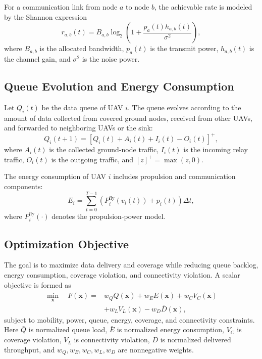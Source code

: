 \documentclass[lettersize,journal]{IEEEtran}
\begin{document}
For a communication link from node $a$ to node $b$, the achievable rate is modeled by the Shannon expression
\begin{equation}
r_{a,b}(t)=B_{a,b}\log_2\left(1+\frac{p_a(t)h_{a,b}(t)}{\sigma^2}\right),
\label{eq:link-rate}
\end{equation}
where $B_{a,b}$ is the allocated bandwidth, $p_a(t)$ is the transmit power, $h_{a,b}(t)$ is the channel gain, and $\sigma^2$ is the noise power.

\subsection{Queue Evolution and Energy Consumption}
Let $Q_i(t)$ be the data queue of UAV $i$. The queue evolves according to the amount of data collected from covered ground nodes, received from other UAVs, and forwarded to neighboring UAVs or the sink:
\begin{equation}
Q_i(t+1)=\left[Q_i(t)+A_i(t)+I_i(t)-O_i(t)\right]^+,
\label{eq:queue-update}
\end{equation}
where $A_i(t)$ is the collected ground-node traffic, $I_i(t)$ is the incoming relay traffic, $O_i(t)$ is the outgoing traffic, and $[z]^+=\max(z,0)$.

The energy consumption of UAV $i$ includes propulsion and communication components:
\begin{equation}
E_i=\sum_{t=0}^{T-1}\left(P_i^{\mathrm{fly}}(v_i(t))+p_i(t)\right)\Delta t,
\label{eq:energy}
\end{equation}
where $P_i^{\mathrm{fly}}(\cdot)$ denotes the propulsion-power model.

\subsection{Optimization Objective}
The goal is to maximize data delivery and coverage while reducing queue backlog, energy consumption, coverage violation, and connectivity violation. A scalar objective is formed as
\begin{align}
\min_{\mathbf{x}} \quad
F(\mathbf{x})={}&
w_Q\bar{Q}(\mathbf{x})
+w_E\bar{E}(\mathbf{x})
+w_C V_C(\mathbf{x}) \nonumber\\
&+w_L V_L(\mathbf{x})
-w_D\bar{D}(\mathbf{x}),
\label{eq:objective}
\end{align}
subject to mobility, power, queue, energy, coverage, and connectivity constraints. Here $\bar{Q}$ is normalized queue load, $\bar{E}$ is normalized energy consumption, $V_C$ is coverage violation, $V_L$ is connectivity violation, $\bar{D}$ is normalized delivered throughput, and $w_Q,w_E,w_C,w_L,w_D$ are nonnegative weights.
\end{document}
